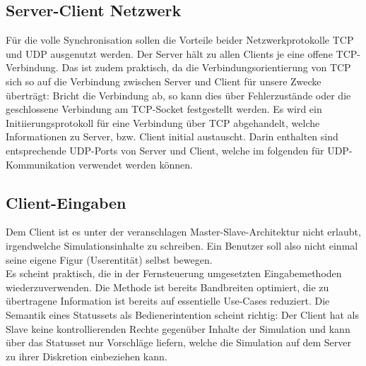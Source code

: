 \subsection{Server-Client Netzwerk}
Für die volle Synchronisation sollen die Vorteile beider Netzwerkprotokolle TCP und UDP ausgenutzt werden. Der Server hält zu allen Clients je eine offene TCP-Verbindung. Das ist zudem praktisch, da die Verbindungsorientierung von TCP sich so auf die Verbindung zwischen Server und Client für unsere Zwecke überträgt: Bricht die Verbindung ab, so kann dies über Fehlerzustände oder die geschlossene Verbindung am TCP-Socket festgestellt werden.
Es wird ein Initiierungsprotokoll für eine Verbindung über TCP abgehandelt, welche Informationen zu Server, bzw. Client initial austauscht. Darin enthalten sind entsprechende UDP-Ports von Server und Client, welche im folgenden für UDP-Kommunikation verwendet werden können.\\

\subsection{Client-Eingaben}
Dem Client ist es unter der veranschlagen Master-Slave-Architektur nicht erlaubt, irgendwelche Simulationsinhalte zu schreiben. Ein Benutzer soll also nicht einmal seine eigene Figur (Userentität) selbst bewegen.\\
Es scheint praktisch, die in der Fernsteuerung umgesetzten Eingabemethoden wiederzuverwenden. Die Methode ist bereits Bandbreiten optimiert, die zu übertragene Information ist bereits auf essentielle Use-Cases reduziert. Die Semantik eines Statussets als Bedienerintention scheint richtig: Der Client hat als Slave keine kontrollierenden Rechte gegenüber Inhalte der Simulation und kann über das Statusset nur Vorschläge liefern, welche die Simulation auf dem Server zu ihrer Diskretion einbeziehen kann.